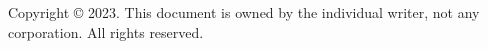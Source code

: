 \backmatter



\listoffigures






\vfill
\noindent
{\scriptsize\relax
Copyright © 2023.
This document is owned by the individual writer, not any corporation. All rights reserved.}




